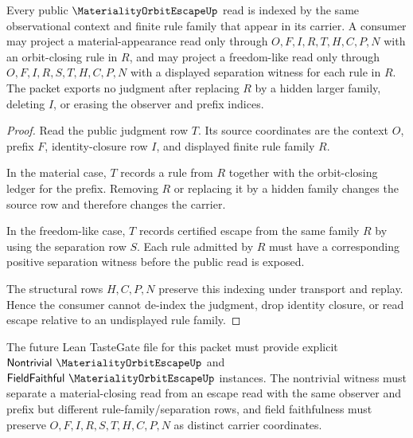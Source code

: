 \begin{theorem}\label{thm:materiality-orbit-escape-rule-family-nonescape}
Every public $\MaterialityOrbitEscapeUp$ read is indexed by the same observational context and finite rule family that appear in its carrier. A consumer may project a material-appearance read only through $O,F,I,R,T,H,C,P,N$ with an orbit-closing rule in $R$, and may project a freedom-like read only through $O,F,I,R,S,T,H,C,P,N$ with a displayed separation witness for each rule in $R$. The packet exports no judgment after replacing $R$ by a hidden larger family, deleting $I$, or erasing the observer and prefix indices.
\end{theorem}
\begin{proof}
Read the public judgment row $T$. Its source coordinates are the context $O$, prefix $F$, identity-closure row $I$, and displayed finite rule family $R$.

In the material case, $T$ records a rule from $R$ together with the orbit-closing ledger for the prefix. Removing $R$ or replacing it by a hidden family changes the source row and therefore changes the carrier.

In the freedom-like case, $T$ records certified escape from the same family $R$ by using the separation row $S$. Each rule admitted by $R$ must have a corresponding positive separation witness before the public read is exposed.

The structural rows $H,C,P,N$ preserve this indexing under transport and replay. Hence the consumer cannot de-index the judgment, drop identity closure, or read escape relative to an undisplayed rule family.
\end{proof}



The future Lean TasteGate file for this packet must provide explicit $\mathsf{Nontrivial}\ \MaterialityOrbitEscapeUp$ and $\mathsf{FieldFaithful}\ \MaterialityOrbitEscapeUp$ instances. The nontrivial witness must separate a material-closing read from an escape read with the same observer and prefix but different rule-family/separation rows, and field faithfulness must preserve $O,F,I,R,S,T,H,C,P,N$ as distinct carrier coordinates.

